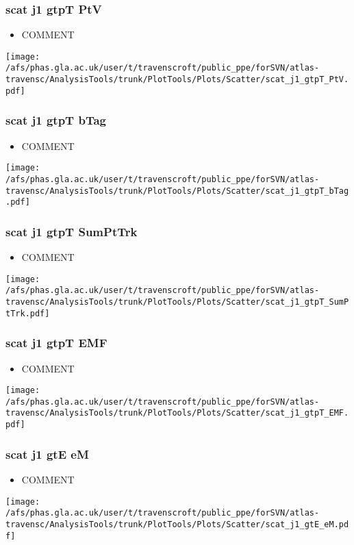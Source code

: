 \documentclass{beamer}
\begin{document}
\begin{frame}
\frametitle{scat j1 gtpT PtV}
\begin{itemize}
\item COMMENT
\end{itemize}
\begin{center}
\texttt{[image: /afs/phas.gla.ac.uk/user/t/travenscroft/public\_ppe/forSVN/atlas-travensc/AnalysisTools/trunk/PlotTools/Plots/Scatter/scat\_j1\_gtpT\_PtV.pdf]}
\end{center}
\end{frame}

\begin{frame}
\frametitle{scat j1 gtpT bTag}
\begin{itemize}
\item COMMENT
\end{itemize}
\begin{center}
\texttt{[image: /afs/phas.gla.ac.uk/user/t/travenscroft/public\_ppe/forSVN/atlas-travensc/AnalysisTools/trunk/PlotTools/Plots/Scatter/scat\_j1\_gtpT\_bTag.pdf]}
\end{center}
\end{frame}

\begin{frame}
\frametitle{scat j1 gtpT SumPtTrk}
\begin{itemize}
\item COMMENT
\end{itemize}
\begin{center}
\texttt{[image: /afs/phas.gla.ac.uk/user/t/travenscroft/public\_ppe/forSVN/atlas-travensc/AnalysisTools/trunk/PlotTools/Plots/Scatter/scat\_j1\_gtpT\_SumPtTrk.pdf]}
\end{center}
\end{frame}

\begin{frame}
\frametitle{scat j1 gtpT EMF}
\begin{itemize}
\item COMMENT
\end{itemize}
\begin{center}
\texttt{[image: /afs/phas.gla.ac.uk/user/t/travenscroft/public\_ppe/forSVN/atlas-travensc/AnalysisTools/trunk/PlotTools/Plots/Scatter/scat\_j1\_gtpT\_EMF.pdf]}
\end{center}
\end{frame}

\begin{frame}
\frametitle{scat j1 gtE eM}
\begin{itemize}
\item COMMENT
\end{itemize}
\begin{center}
\texttt{[image: /afs/phas.gla.ac.uk/user/t/travenscroft/public\_ppe/forSVN/atlas-travensc/AnalysisTools/trunk/PlotTools/Plots/Scatter/scat\_j1\_gtE\_eM.pdf]}
\end{center}
\end{frame}
\end{document}
